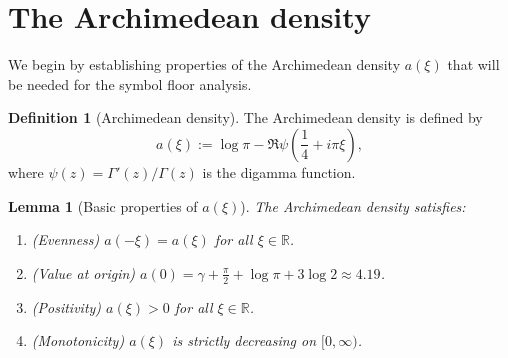 \documentclass[11pt,a4paper]{article}
\newtheorem{lemma}[theorem]{Lemma}
\theoremstyle{definition}
\newtheorem{definition}[theorem]{Definition}
\theoremstyle{remark}
\newcommand{\R}{\mathbb{R}}
\begin{document}
\section{The Archimedean density}\label{sec:density}

We begin by establishing properties of the Archimedean density $a(\xi)$ that will be needed for the symbol floor analysis.

\begin{definition}[Archimedean density]
The Archimedean density is defined by
\begin{equation}\label{eq:a-def}
  a(\xi) := \log \pi - \Re \psi\left(\frac{1}{4} + i\pi\xi\right),
\end{equation}
where $\psi(z) = \Gamma'(z)/\Gamma(z)$ is the digamma function.
\end{definition}

\begin{lemma}[Basic properties of $a(\xi)$]\label{lem:a-basic}
The Archimedean density satisfies:
\begin{enumerate}[label=(\roman*)]
\item (Evenness) $a(-\xi) = a(\xi)$ for all $\xi \in \R$.
\item (Value at origin) $a(0) = \gamma + \frac{\pi}{2} + \log \pi + 3\log 2 \approx 4.19$.
\item (Positivity) $a(\xi) > 0$ for all $\xi \in \R$.
\item (Monotonicity) $a(\xi)$ is strictly decreasing on $[0, \infty)$.
\end{enumerate}
\end{lemma}
\end{document}
